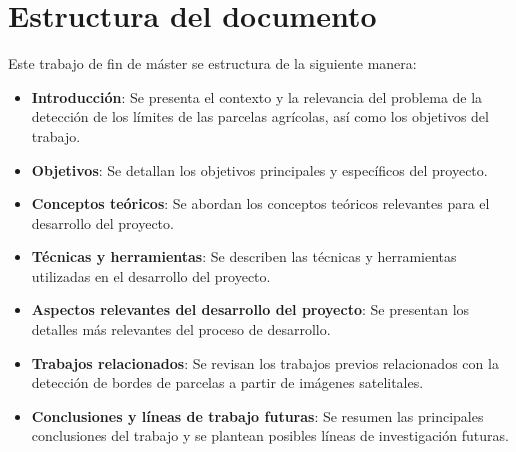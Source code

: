\section{Estructura del documento}
Este trabajo de fin de máster se estructura de la siguiente manera:
\begin{itemize}
	\item\textbf{Introducción}: Se presenta el contexto y la relevancia del problema de la detección de los límites de las parcelas agrícolas, así como los objetivos del trabajo.
	\item\textbf{Objetivos}: Se detallan los objetivos principales y específicos del proyecto.
	\item\textbf{Conceptos teóricos}: Se abordan los conceptos teóricos relevantes para el desarrollo del proyecto.
	\item\textbf{Técnicas y herramientas}: Se describen las técnicas y herramientas utilizadas en el desarrollo del proyecto.
	\item\textbf{Aspectos relevantes del desarrollo del proyecto}: Se presentan los detalles más relevantes del proceso de desarrollo.
	\item\textbf{Trabajos relacionados}: Se revisan los trabajos previos relacionados con la detección de bordes de parcelas a partir de imágenes satelitales.
	\item\textbf{Conclusiones y líneas de trabajo futuras}: Se resumen las principales conclusiones del trabajo y se plantean posibles líneas de investigación futuras.
\end{itemize}
